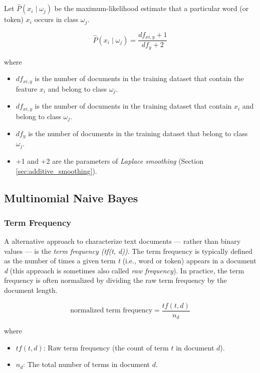 \documentclass{article}
\begin{document}
Let  $\hat{P}(x_i \mid \omega_j)$ be the maximum-likelihood estimate that a particular word (or token) $x_i$ occurs in class $\omega_j$. 

\begin{equation} \hat{P}(x_i \mid \omega_j) = \frac{df_{xi, y} + 1}{df_y + 2} \end{equation} 

where

\begin{itemize}
\item $df_{xi, y}$ is the number of documents in the training dataset that contain the feature $x_i$ and belong to class $\omega_j$.
\item  $df_{xi, y}$ is the number of documents in the training dataset that contain $x_i$ and belong to class $\omega_j$.
\item  $df_y$ is the number of documents in the training dataset that belong to class $\omega_j$.
\item  +1 and +2 are the parameters of \emph{Laplace smoothing} (Section \ref{sec:additive_smoothing}).
\end{itemize}

\subsection{Multinomial Naive Bayes}
\label{sec:multinomial_bayes}

\subsubsection{Term Frequency}
\label{sec:term_frequency}

A alternative approach to characterize text documents --- rather than binary values ---  is the \emph{term frequency (tf(t, d))}. The term frequency is typically defined as the number of times a given term \emph{t} (i.e., word or token) appears in a document \emph{d} (this approach is sometimes also called \emph{raw frequency}). In practice, the term frequency is often normalized by dividing the raw term frequency by the document length.

\begin{equation}\text{normalized term frequency} = \frac{tf(t, d)}{n_d}\end{equation}

where 

\begin{itemize}
\item  $tf(t, d)$: Raw term frequency (the count of term $t$ in document $d$).
\item $n_d$: The total number of terms in document $d$.
\end{itemize}
\end{document}
